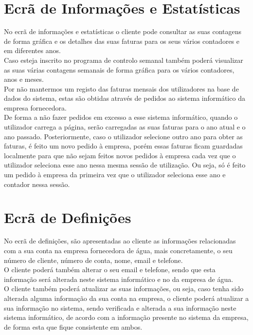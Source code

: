 \section{Ecrã de Informações e Estatísticas} \label{ecra:info}
No ecrã de informações e estatísticas o cliente pode consultar as suas contagens de forma gráfica e os detalhes das suas faturas para os seus vários contadores e em diferentes anos.\\
Caso esteja inscrito no programa de controlo semanal também poderá visualizar as suas várias contagens semanais de forma gráfica para os vários contadores, anos e meses.\\
Por não mantermos um registo das faturas mensais dos utilizadores na base de dados do sistema, estas são obtidas através de pedidos ao sistema informático da empresa fornecedora.\\
De forma a não fazer pedidos em excesso a esse sistema informático, quando o utilizador carrega a página, serão carregadas as suas faturas para o ano atual e o ano passado. Posteriormente, caso o utilizador selecione outro ano para obter as faturas, é feito um novo pedido à empresa, porém essas faturas ficam guardadas localmente para que não sejam feitos novos pedidos à empresa cada vez que o utilizador seleciona esse ano nessa mesma sessão de utilização. Ou seja, só é feito um pedido à empresa da primeira vez que o utilizador seleciona esse ano e contador nessa sessão.\\

\section{Ecrã de Definições} \label{ecra:def}
No ecrã de definições, são apresentadas ao cliente as informações relacionadas com a sua conta na empresa fornecedora de água, mais concretamente, o seu número de cliente, número de conta, nome, email e telefone.\\
O cliente poderá também alterar o seu email e telefone, sendo que esta informação será alterada neste sistema informático e no da empresa de água.\\
O cliente também poderá atualizar as suas informações, ou seja, caso tenha sido alterada alguma informação da sua conta na empresa, o cliente poderá atualizar a sua informação no sistema, sendo verificada e alterada a sua informação neste sistema informático, de acordo com a informação presente no sistema da empresa, de forma esta que fique consistente em ambos.

